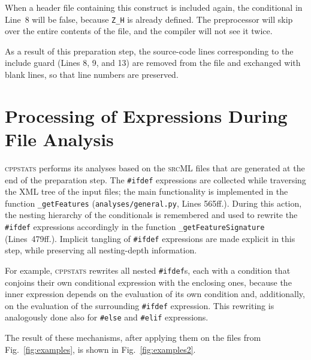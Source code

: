 \documentclass[a4paper]{scrartcl}
\newcommand\code[1]{\texttt{#1}}
\newcommand\feature[1]{\texttt{#1}}
\newcommand\tool[1]{\textsc{#1}}
\newcommand\ifdeff[1]{\code{\##1}\xspace}
\newcommand\ifdef[0]{{\upshape\ifdeff{ifdef}}\xspace}
\newcommand\ifdefs[0]{\ifdef{}s\xspace}
\newcommand\cppstats[0]{\tool{cppstats}\xspace}
\begin{document}
When a header file containing this construct is included again, the conditional in Line~8 will be false, because \feature{Z\_H} is already defined.
The preprocessor will skip over the entire contents of the file, and the compiler will not see it twice.

As a result of this preparation step, the source-code lines corresponding to the include guard (Lines 8, 9, and 13) are removed from the file and exchanged with blank lines, so that line numbers are preserved.



\section{Processing of Expressions During File Analysis}
\label{sec:processing}

\cppstats performs its analyses based on the \tool{srcML} files that are generated at the end of the preparation step.
The \ifdef expressions are collected while traversing the \tool{XML} tree of the input files;
the main functionality is implemented in the function \code{\_getFeatures} (\code{analyses/general.py}, Lines 565ff.).
During this action, the nesting hierarchy of the conditionals is remembered and used to rewrite the \ifdef expressions accordingly in the function \code{\_getFeatureSignature} (Lines~479ff.).
Implicit tangling of \ifdef expressions are made explicit in this step, while preserving all nesting-depth information.

For example, \cppstats rewrites all nested \ifdefs, each with a condition that conjoins their own conditional expression with the enclosing ones, because the inner expression depends on the evaluation of its own condition and, additionally, on the evaluation of the surrounding \ifdef expression.
This rewriting is analogously done also for \ifdeff{else} and \ifdeff{elif} expressions.
 
The result of these mechanisms, after applying them on the files from Fig.\ \ref{fig:examples}, is shown in Fig.\ \ref{fig:examples2}.
\end{document}
